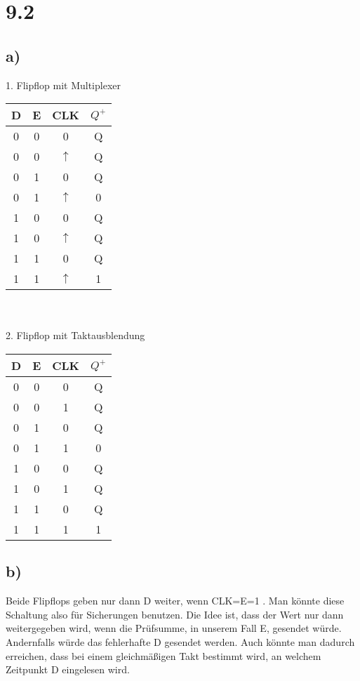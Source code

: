 \documentclass{article}
\begin{document}
\section*{9.2}

	\subsection*{a)}
	1. Flipflop mit Multiplexer \\

			\begin{tabular}{|c|c|c||c|}\hline
			D & E & CLK & $Q^+$ \\ \hline
			0 & 0 & 0 & Q \\
			0 & 0 & $\uparrow$ & Q \\
			0 & 1 & 0 & Q \\
			0 & 1 & $\uparrow$ & 0 \\
			1 & 0 & 0 & Q \\
			1 & 0 & $\uparrow$ & Q \\
			1 & 1 & 0 & Q \\
			1 & 1 & $\uparrow$ & 1 \\ \hline


		\end{tabular}\\
		\\

	2. Flipflop mit Taktausblendung \\

	\begin{tabular}{|c|c|c||c|}\hline
			D & E & CLK & $Q^+$ \\ \hline
			0 & 0 & 0 & Q \\
			0 & 0 & 1 & Q \\
			0 & 1 & 0 & Q \\
			0 & 1 & 1 & 0 \\
			1 & 0 & 0 & Q \\
			1 & 0 & 1 & Q \\
			1 & 1 & 0 & Q \\
			1 & 1 & 1 & 1 \\ \hline


		\end{tabular}


	\subsection*{b)}

	Beide Flipflops geben nur dann D weiter, wenn CLK=E=1 . Man könnte diese Schaltung also für Sicherungen benutzen. Die Idee ist, dass der Wert nur dann weitergegeben wird, wenn die Prüfsumme, in unserem Fall E, gesendet würde. Andernfalls würde das fehlerhafte D gesendet werden. 
	Auch könnte man dadurch erreichen, dass bei einem gleichmäßigen Takt bestimmt wird, an welchem Zeitpunkt D eingelesen wird. 
\end{document}
